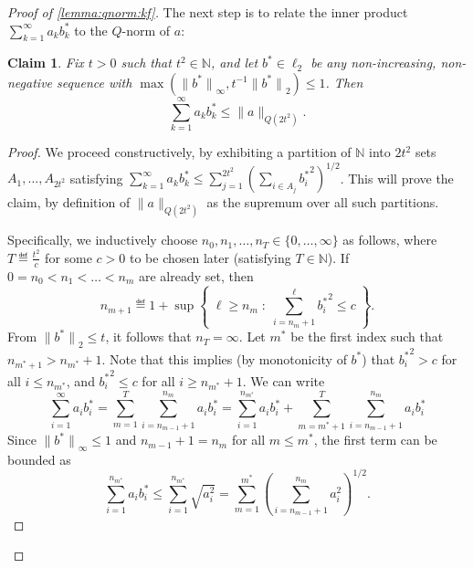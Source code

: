 \documentclass[11pt]{article}
\newtheorem{claim}[clm]{Claim}
\theoremstyle{remark}   	\newtheorem{remark}[theorem]{Remark}
\theoremstyle{definition}   	\newaliascnt{defn}{theorem}
\newenvironment{proofof}[1]{\begin{proof}[Proof of {#1}]}{\end{proof}}
\newcommand{\setOfSuchThat}[2]{ \left\{\; #1 \;\colon\; #2\; \right\} } 			\newcommand{\indicSet}[1]{\mathds{1}_{#1}}                                              \newcommand{\indic}[1]{\indicSet{\left\{#1\right\}}}                                             \newcommand{\disjunion}{\amalg}
\newcommand{\norm}[1]{\lVert#1{\rVert}}
\newcommand{\normtwo}[1]{{\norm{#1}}_2}
\newcommand{\norminf}[1]{{\norm{#1}}_\infty}
\newcommand{\N}{\ensuremath{\mathbb{N}}\xspace}
\newcommand{\lp}[1][1]{\ell_{#1}}
\begin{document}
\begin{proofof}{\autoref{lemma:qnorm:kf}}
  The next step is to relate the inner product $\sum_{k=1}^\infty a_kb^\ast_k$ to the $Q$-norm of $a$:
  \begin{claim}\label{claim:proof:lemma:qnorm:kf:2}
  Fix $t > 0$ such that $t^2\in\N$, and let $b^\ast\in\lp[2]$ be any non-increasing, non-negative sequence with $\max( \norminf{b^\ast}, t^{-1}\normtwo{b^\ast} ) \leq 1$. Then
  \[
      \sum_{k=1}^\infty a_kb^\ast_k \leq \norm{a}_{Q(2t^2)}.
  \]
  \end{claim}
  \begin{proof}
  We proceed constructively, by exhibiting a partition of $\N$ into $2t^2$ sets $A_1,\dots, A_{2t^2}$ satisfying $\sum_{k=1}^\infty a_kb^\ast_k \leq \sum_{j=1}^{2t^2} \left( \sum_{i\in A_j} {b^\ast_i}^2 \right)^{1/2}$. This will prove the claim, by definition of $\norm{a}_{Q(2t^2)}$ as the supremum over all such partitions.
  
   Specifically, we inductively choose $n_0,n_1,\dots,n_{T}\in\{0,\dots,\infty\}$ as follows, where $T\eqdef \frac{t^2}{c}$ for some $c>0$ to be chosen later (satisfying $T\in\N$). If $0=n_0 < n_1 < \dots < n_m$ are already set, then
  \[
      n_{m+1} \eqdef 1 + \sup\setOfSuchThat{ \ell \geq n_m }{ \sum_{i=n_m+1}^\ell {b^\ast_i}^2 \leq c  }.
  \]
  From $\normtwo{b^\ast}\leq t$, it follows that $n_{T} = \infty$. Let $m^\ast$ be the first index such that $n_{m^\ast+1} > n_{m^\ast} +1$. Note that this implies (by monotonicity of $b^\ast$) that ${b^\ast_i}^2 > c$ for all $i \leq n_{m^\ast}$, and ${b^\ast_i}^2 \leq c$ for all $i \geq n_{m^\ast}+1$. We can write
  \[
      \sum_{i=1}^\infty a_i{b^\ast_i} 
      = \sum_{m=1}^{T} \sum_{i=n_{m-1}+1}^{n_m} a_i{b^\ast_i}
            = \sum_{i=1}^{n_{m^\ast}} a_i{b^\ast_i} + \sum_{m=m^\ast+1}^{T} \sum_{i=n_{m-1}+1}^{n_m} a_i{b^\ast_i}
  \]
   Since $\norminf{b^\ast}\leq 1$ and $n_{m-1}+1 = n_m$ for all $m \leq m^\ast$, the first term can be bounded as
   \[
        \sum_{i=1}^{n_{m^\ast}} a_ib^\ast_i \leq  \sum_{i=1}^{n_{m^\ast}} \sqrt{a_i^2} = \sum_{m=1}^{m^\ast} \left( \sum_{i=n_{m-1}+1}^{n_m} a_i^2 \right)^{1/2}.
   \]
  

\end{proof}
\end{proofof}
\end{document}
